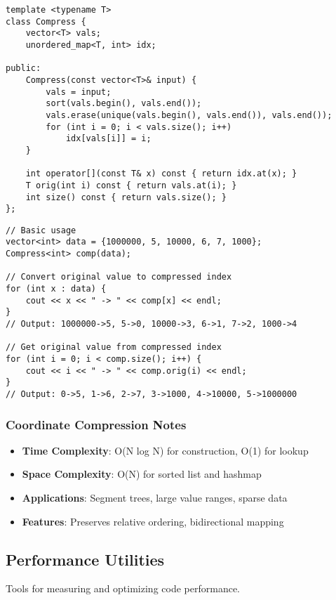 \documentclass[11pt,a4paper]{article}
\begin{document}
\begin{lstlisting}[caption={Coordinate Compression Template}]
template <typename T>
class Compress {
    vector<T> vals;
    unordered_map<T, int> idx;

public:
    Compress(const vector<T>& input) {
        vals = input;
        sort(vals.begin(), vals.end());
        vals.erase(unique(vals.begin(), vals.end()), vals.end());
        for (int i = 0; i < vals.size(); i++)
            idx[vals[i]] = i;
    }

    int operator[](const T& x) const { return idx.at(x); }
    T orig(int i) const { return vals.at(i); }
    int size() const { return vals.size(); }
};
\end{lstlisting}

\begin{lstlisting}[caption={Coordinate Compression Example}]
// Basic usage
vector<int> data = {1000000, 5, 10000, 6, 7, 1000};
Compress<int> comp(data);

// Convert original value to compressed index
for (int x : data) {
    cout << x << " -> " << comp[x] << endl;
}
// Output: 1000000->5, 5->0, 10000->3, 6->1, 7->2, 1000->4

// Get original value from compressed index
for (int i = 0; i < comp.size(); i++) {
    cout << i << " -> " << comp.orig(i) << endl;
}
// Output: 0->5, 1->6, 2->7, 3->1000, 4->10000, 5->1000000
\end{lstlisting}

\subsubsection*{Coordinate Compression Notes}
\begin{itemize}
\item \textbf{Time Complexity}: O(N log N) for construction, O(1) for lookup
\item \textbf{Space Complexity}: O(N) for sorted list and hashmap
\item \textbf{Applications}: Segment trees, large value ranges, sparse data
\item \textbf{Features}: Preserves relative ordering, bidirectional mapping
\end{itemize}

\newpage

\subsection{Performance Utilities}
Tools for measuring and optimizing code performance.
\end{document}
